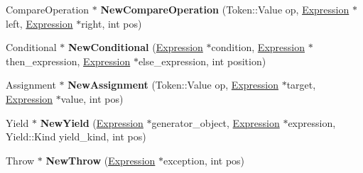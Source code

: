 \begin{DoxyCompactItemize}
\item 
\hypertarget{classv8_1_1internal_1_1_b_a_s_e___e_m_b_e_d_d_e_d_a62375b5a78241f4e936d3eab880c30ca}{}Compare\+Operation $\ast$ {\bfseries New\+Compare\+Operation} (Token\+::\+Value op, \hyperlink{classv8_1_1internal_1_1_expression}{Expression} $\ast$left, \hyperlink{classv8_1_1internal_1_1_expression}{Expression} $\ast$right, int pos)\label{classv8_1_1internal_1_1_b_a_s_e___e_m_b_e_d_d_e_d_a62375b5a78241f4e936d3eab880c30ca}

\item 
\hypertarget{classv8_1_1internal_1_1_b_a_s_e___e_m_b_e_d_d_e_d_a4c1293d51375010bf0f24421e2ce2c76}{}Conditional $\ast$ {\bfseries New\+Conditional} (\hyperlink{classv8_1_1internal_1_1_expression}{Expression} $\ast$condition, \hyperlink{classv8_1_1internal_1_1_expression}{Expression} $\ast$then\+\_\+expression, \hyperlink{classv8_1_1internal_1_1_expression}{Expression} $\ast$else\+\_\+expression, int position)\label{classv8_1_1internal_1_1_b_a_s_e___e_m_b_e_d_d_e_d_a4c1293d51375010bf0f24421e2ce2c76}

\item 
\hypertarget{classv8_1_1internal_1_1_b_a_s_e___e_m_b_e_d_d_e_d_abe43772accefd79934f57f45d8f77799}{}Assignment $\ast$ {\bfseries New\+Assignment} (Token\+::\+Value op, \hyperlink{classv8_1_1internal_1_1_expression}{Expression} $\ast$target, \hyperlink{classv8_1_1internal_1_1_expression}{Expression} $\ast$value, int pos)\label{classv8_1_1internal_1_1_b_a_s_e___e_m_b_e_d_d_e_d_abe43772accefd79934f57f45d8f77799}

\item 
\hypertarget{classv8_1_1internal_1_1_b_a_s_e___e_m_b_e_d_d_e_d_a0955b8286da435d5ccd95f40922fe5e4}{}Yield $\ast$ {\bfseries New\+Yield} (\hyperlink{classv8_1_1internal_1_1_expression}{Expression} $\ast$generator\+\_\+object, \hyperlink{classv8_1_1internal_1_1_expression}{Expression} $\ast$expression, Yield\+::\+Kind yield\+\_\+kind, int pos)\label{classv8_1_1internal_1_1_b_a_s_e___e_m_b_e_d_d_e_d_a0955b8286da435d5ccd95f40922fe5e4}

\item 
\hypertarget{classv8_1_1internal_1_1_b_a_s_e___e_m_b_e_d_d_e_d_aa9c9a4ab2d2a9f4a2868242f8850a3e3}{}Throw $\ast$ {\bfseries New\+Throw} (\hyperlink{classv8_1_1internal_1_1_expression}{Expression} $\ast$exception, int pos)\label{classv8_1_1internal_1_1_b_a_s_e___e_m_b_e_d_d_e_d_aa9c9a4ab2d2a9f4a2868242f8850a3e3}


\end{DoxyCompactItemize}
